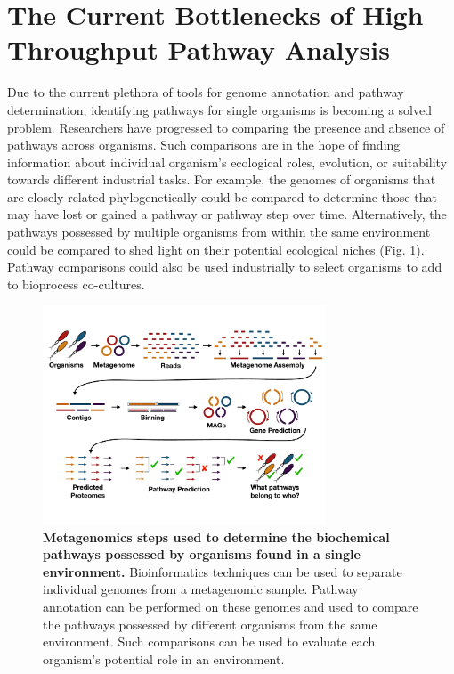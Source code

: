 \section{The Current Bottlenecks of High Throughput Pathway Analysis}

Due to the current plethora of tools for genome annotation and pathway 
determination, identifying pathways for single organisms is becoming a solved 
problem. Researchers have progressed to comparing the presence and absence of 
pathways across organisms. Such comparisons are in the hope of finding 
information about individual organism's ecological roles, evolution, or 
suitability towards different industrial tasks. For example, the genomes of 
organisms that are closely related phylogenetically could be compared to 
determine those that may have lost or gained a pathway or pathway step over 
time. Alternatively, the pathways possessed by multiple organisms from within 
the same environment could be compared to shed light on their potential 
ecological niches (Fig. \ref{fig:metagenomics}). Pathway comparisons could also 
be used industrially to select organisms to add to bioprocess co-cultures.

\begin{figure}[!ht]
  \centering
	\includegraphics[width=0.75\textwidth]{media/metagenomics.pdf}
	\caption[Metagenomics steps used to determine the biochemical pathways 
possessed by organisms found in a single environment.]{\textbf{Metagenomics 
steps used to determine the biochemical pathways possessed by organisms found in 
a single environment.} Bioinformatics techniques can be used to separate 
individual genomes from a metagenomic sample. Pathway annotation can be 
performed on these genomes and used to compare the pathways possessed by 
different organisms from the same environment. Such comparisons can be used to 
evaluate each organism's potential role in an environment.}
	 \label{fig:metagenomics}
\end{figure}

